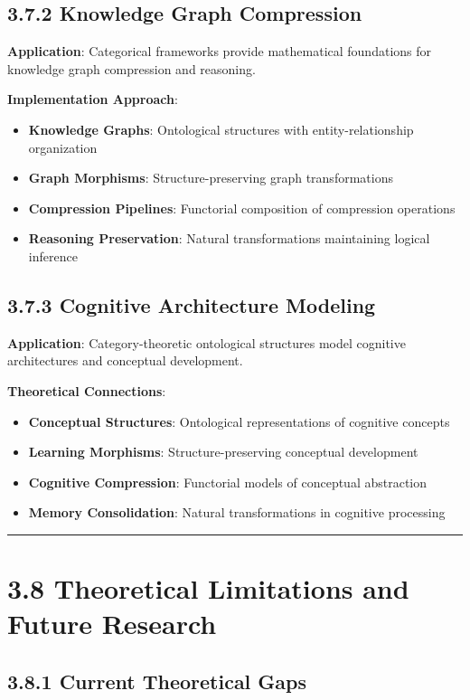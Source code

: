 \subsection{3.7.2 Knowledge Graph Compression}

\textbf{Application}: Categorical frameworks provide mathematical foundations for knowledge graph compression and reasoning.

\textbf{Implementation Approach}:
\begin{itemize}
\item \textbf{Knowledge Graphs}: Ontological structures with entity-relationship organization
\item \textbf{Graph Morphisms}: Structure-preserving graph transformations
\item \textbf{Compression Pipelines}: Functorial composition of compression operations
\item \textbf{Reasoning Preservation}: Natural transformations maintaining logical inference
\end{itemize}

\subsection{3.7.3 Cognitive Architecture Modeling}

\textbf{Application}: Category-theoretic ontological structures model cognitive architectures and conceptual development.

\textbf{Theoretical Connections}:
\begin{itemize}
\item \textbf{Conceptual Structures}: Ontological representations of cognitive concepts
\item \textbf{Learning Morphisms}: Structure-preserving conceptual development
\item \textbf{Cognitive Compression}: Functorial models of conceptual abstraction
\item \textbf{Memory Consolidation}: Natural transformations in cognitive processing
\end{itemize}

\hrule

\section{3.8 Theoretical Limitations and Future Research}

\subsection{3.8.1 Current Theoretical Gaps}

